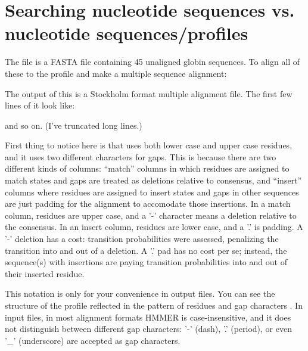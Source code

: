 \section{Searching nucleotide sequences vs. nucleotide sequences/profiles}

The file  is a FASTA file containing 45
unaligned globin sequences. To align all of these to the
 profile and make a multiple sequence alignment:

   \vspace{1ex}
   \vspace{1ex}

The output of this is a Stockholm format multiple alignment file. The
first few lines of it look like:


and so on. (I've truncated long lines.)

First thing to notice here is that  uses both lower
case and upper case residues, and it uses two different characters for
gaps.  This is because there are two different kinds of columns:
``match'' columns in which residues are assigned to match states and
gaps are treated as deletions relative to consensus, and ``insert''
columns where residues are assigned to insert states and gaps in other
sequences are just padding for the alignment to accomodate those
insertions. In a match column, residues are upper case, and a '-'
character means a deletion relative to the consensus. In an insert
column, residues are lower case, and a '.' is padding.  A '-' deletion
has a cost: transition probabilities were assessed, penalizing the
transition into and out of a deletion. A '.' pad has no cost per se;
instead, the sequence(s) with insertions are paying transition
probabilities into and out of their inserted residue.

This notation is only for your convenience in output files. You can
see the structure of the profile reflected in the pattern of
residues and gap characters .  In input files, in
most alignment formats HMMER is
case-insensitive, and it does not distinguish between different gap
characters: '-' (dash), '.' (period), or even '\_' (underscore) are
accepted as gap characters.

